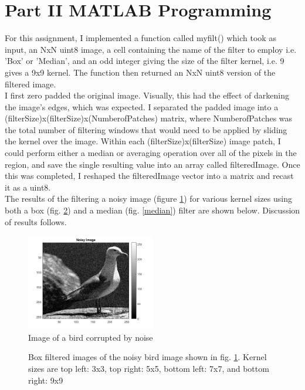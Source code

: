 \documentclass{article}[12 pt]
\begin{document}
\section*{Part II MATLAB Programming}
For this assignment, I implemented a function called myfilt() which took as input, an NxN uint8 image, a cell containing the name of the filter to employ i.e. {'Box'} or {'Median'}, and an odd integer giving the size of the filter kernel, i.e. 9 gives a 9x9 kernel. The function then returned an NxN uint8 version of the filtered image.  \\

\noindent
I first zero padded the original image.  Visually, this had the effect of darkening the image's edges, which was expected.  I separated the padded image into a (filterSize)x(filterSize)x(NumberofPatches) matrix, where NumberofPatches was the total number of filtering windows that would need to be applied by sliding the kernel over the image.  Within each (filterSize)x(filterSize) image patch, I could perform either a median or averaging operation over all of the pixels in the region, and save the single resulting value into an array called filteredImage.  Once this was completed, I reshaped the filteredImage vector into a matrix and recast it as a uint8. \\

\noindent
The results of the filtering a noisy image (figure \ref{noise}) for various kernel sizes using both a box (fig. \ref{box}) and a median (fig. \ref{median}) filter are shown below.  Discussion of results follows.

\begin{center}
	\begin{figure}[H]
		\centering
		\includegraphics[width = 0.5\textwidth]{Images/Noisy.jpg}
		\caption{Image of a bird corrupted by noise}
		\label{noise}
	\end{figure}
\end{center}



\begin{figure}[h!]
\captionsetup[subfloat]{labelformat=empty}
\centering
{}
\hspace{0mm}
\caption{Box filtered images of the noisy bird image shown in fig. \ref{noise}.  Kernel sizes are top left: 3x3, top right: 5x5, bottom left: 7x7, and bottom right: 9x9}
\label{box}
\end{figure}
\end{document}
